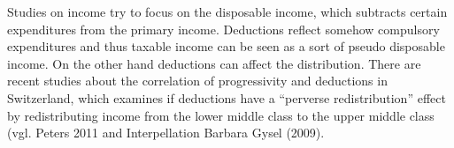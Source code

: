 \documentclass[twoside]{article}\usepackage[]{graphicx}\usepackage[]{color}
\begin{document}
\begin{multicols}{2}
Studies on income try to focus on the disposable income, which subtracts certain expenditures from the primary income. Deductions reflect somehow compulsory expenditures and thus taxable income can be seen as a sort of pseudo disposable income. On the other hand deductions can affect the distribution. There are recent studies about the correlation of progressivity and deductions in Switzerland, which examines if deductions have a “perverse redistribution” effect by redistributing income from the lower middle class to the upper middle class (vgl. Peters 2011 and Interpellation Barbara Gysel (2009).








\end{multicols}
\end{document}
